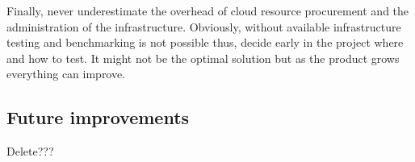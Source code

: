 Finally, never underestimate the overhead of cloud resource procurement and the administration of the infrastructure. Obviously, without available infrastructure testing and benchmarking is not possible thus, decide early in the project where and how to test. It might not be the optimal solution but as the product grows everything can improve.

\subsection{Future improvements}\label{future-improvements}

Delete???